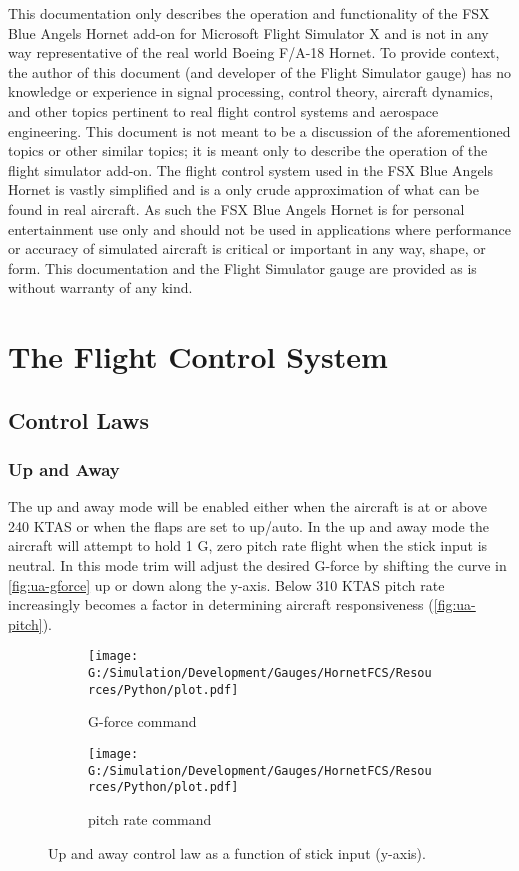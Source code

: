 \documentclass[11pt]{report}
\begin{document}
This documentation only describes the operation and functionality of the FSX Blue Angels Hornet add-on for Microsoft Flight Simulator X and is not in any way representative of the real world Boeing F/A-18 Hornet.  To provide context, the author of this document (and developer of the Flight Simulator gauge) has no knowledge or experience in signal processing, control theory, aircraft dynamics, and other topics pertinent to real flight control systems and aerospace engineering.  This document is not meant to be a discussion of the aforementioned topics or other similar topics; it is meant only to describe the operation of the flight simulator add-on.  The flight control system used in the FSX Blue Angels Hornet is vastly simplified and is a only crude approximation of what can be found in real aircraft.  As such the FSX Blue Angels Hornet is for personal entertainment use only and should not be used in applications where performance or accuracy of simulated aircraft is critical or important in any way, shape, or form.  This documentation and the Flight Simulator gauge are provided as is without warranty of any kind.

\chapter{The Flight Control System}
\thispagestyle{fancy}

\section{Control Laws}

\subsection{Up and Away}

The up and away mode will be enabled either when the aircraft is at or above 240 KTAS or when the flaps are set to up/auto.  In the up and away mode the aircraft will attempt to hold 1 G, zero pitch rate flight when the stick input is neutral.  In this mode trim will adjust the desired G-force by shifting the curve in \autoref{fig:ua-gforce} up or down along the y-axis.  Below 310 KTAS pitch rate increasingly becomes a factor in determining aircraft responsiveness (\autoref{fig:ua-pitch}).

\begin{figure}[H]
    \centering
    \begin{subfigure}[H]{0.4965\textwidth}
        \texttt{[image: G:/Simulation/Development/Gauges/HornetFCS/Resources/Python/plot.pdf]}
        \caption{G-force command}
        \label{fig:ua-gforce}
    \end{subfigure}
    \hfill
    \begin{subfigure}[H]{0.4965\textwidth}
        \texttt{[image: G:/Simulation/Development/Gauges/HornetFCS/Resources/Python/plot.pdf]}
        \caption{pitch rate command}
        \label{fig:ua-pitch}
    \end{subfigure}
    \caption{Up and away control law as a function of stick input (y-axis).}
\end{figure}
\end{document}
